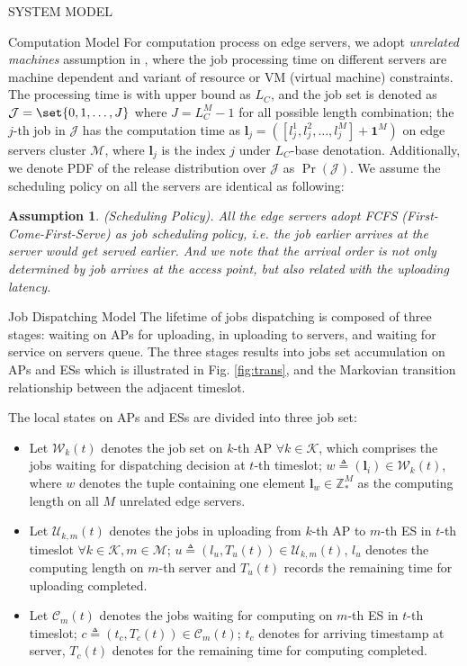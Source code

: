 \documentclass[10pt, conference, letterpaper]{IEEEtran}
\newtheorem{assumption}{Assumption}
\newcommand{\domZ}{\mathbb{Z}_{*}}
\newcommand{\vecOne}{\mathbf{1}}
\renewcommand{\vec}{\mathbf}
\DeclarePairedDelimiter\set\{\}
\newcommand{\apSet}{\mathcal{K}}
\newcommand{\esSet}{\mathcal{M}}
\newcommand{\jSet}{\mathcal{J}}
\newcommand{\wSet}{\mathcal{W}}
\newcommand{\uSet}{\mathcal{U}}
\newcommand{\cSet}{\mathcal{C}}
\begin{document}
\begin{section}{SYSTEM MODEL}
        \begin{subsection}{Computation Model}
            For computation process on edge servers, we adopt \emph{unrelated machines} assumption in \cite{tan-online}, where the job processing time on different servers are machine dependent and variant of resource or VM (virtual machine) constraints. The processing time is with upper bound as $L_C$, and the job set is denoted as $\mathcal{J} = \set{0,1,\dots, J}$ where $J=L_C^M-1$ for all possible length combination; the $j$-th job in $\jSet$ has the computation time as $\vec{l}_j = ([l_j^1, l_j^2, \dots, l_j^M] + \vecOne^M)$ on edge servers cluster $\esSet$, where $\vec{l}_j$ is the index $j$ under $L_C$-base denotation. Additionally, we denote PDF of the release distribution over $\jSet$ as $\Pr(\jSet)$.
            We assume the scheduling policy on all the servers are identical as following:
            \begin{assumption}
                (Scheduling Policy).
                All the edge servers adopt \emph{FCFS} (First-Come-First-Serve) as job scheduling policy, i.e. the job earlier arrives at the server would get served earlier. And we note that the arrival order is not only determined by job arrives at the access point, but also related with the uploading latency.
            \end{assumption}
        \end{subsection}

        \begin{subsection}{Job Dispatching Model}
            The lifetime of jobs dispatching is composed of three stages: waiting on APs for uploading, in uploading to servers, and waiting for service on servers queue. The three stages results into jobs set accumulation on APs and ESs which is illustrated in Fig. \ref{fig:trans}, and the Markovian transition relationship between the adjacent timeslot.

            The local states on APs and ESs are divided into three job set:
            \begin{itemize}
                \item Let $\wSet_{k}(t)$ denotes the job set on $k$-th AP $\forall k \in \apSet$, which comprises the jobs waiting for dispatching decision at $t$-th timeslot; $w \triangleq (\vec{l}_i) \in \wSet_{k}(t)$, where $w$ denotes the tuple containing one element $\vec{l}_w \in \domZ^M$ as the computing length on all $M$ unrelated edge servers.
                \item Let $\uSet_{k,m}(t)$ denotes the jobs in uploading from $k$-th AP to $m$-th ES in $t$-th timeslot $\forall k \in \apSet, m \in \esSet$; $u \triangleq (l_u, T_{u}(t)) \in \uSet_{k,m}(t)$, $l_u$ denotes the computing length on $m$-th server and $T_{u}(t)$ records the remaining time for uploading completed.
                \item Let $\cSet_{m}(t)$ denotes the jobs waiting for computing on $m$-th ES in $t$-th timeslot; $c \triangleq (t_c, T_{c}(t)) \in \cSet_{m}(t)$; $t_c$ denotes for arriving timestamp at server, $T_{c}(t)$ denotes for the remaining time for computing completed.
            \end{itemize}


\end{subsection}
\end{section}
\end{document}
